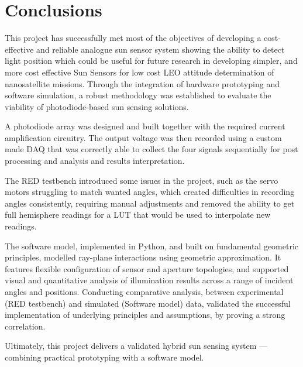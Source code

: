 \chapter{Conclusions}

This project has successfully met most of the objectives of developing a cost-effective and reliable analogue sun sensor system showing the ability to detect light position which could be useful for future research in developing simpler, and more cost effective Sun Sensors for low cost \acf{LEO} attitude determination of nanosatellite missions. Through the integration of hardware prototyping and software simulation, a robust methodology was established to evaluate the viability of photodiode-based sun sensing solutions.

A photodiode array was designed and built together with the required current amplification circuitry. The output voltage was then recorded using a custom made \ac{DAQ} that was correctly able to collect the four signals sequentially for post processing and analysis and results interpretation.


The \acf{RED} testbench introduced some issues in the project, such as the servo motors struggling to match wanted angles, which created difficulties in recording angles consistently, requiring manual adjustments and removed the ability to get full hemisphere readings for a \ac{LUT} that would be used to interpolate new readings.

The software model, implemented in Python, and built on fundamental geometric principles, modelled ray-plane interactions using geometric approximation.  It features flexible configuration of sensor and aperture topologies, and supported visual and quantitative analysis of illumination results across a range of incident angles and positions. Conducting comparative analysis, between experimental (RED testbench) and simulated (Software model) data, validated the successful implementation of underlying principles and assumptions, by proving a strong correlation.

Ultimately, this project delivers a validated hybrid sun sensing system — combining practical prototyping with a software model.
